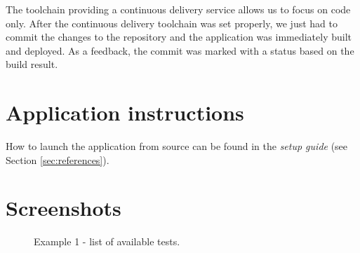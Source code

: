 \documentclass[11pt,a4paper]{article}
\begin{document}
The toolchain providing a continuous delivery service allows us to focus on code only. After the continuous delivery toolchain was set properly, we just had to commit the changes to the repository and the application was immediately built and deployed. As a feedback, the commit was marked with a status based on the build result.

\section{Application instructions}

How to launch the application from source can be found in the \textit{setup guide} (see Section \ref{sec:references}).

\section{Screenshots}

\begin{figure}[H]
    \centering
    \caption{Example 1 - list of available tests.}
    \label{fig:example1}
\end{figure}
\end{document}
